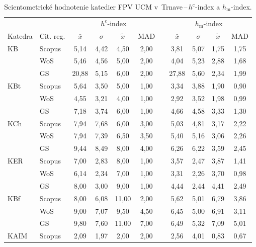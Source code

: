 \begin{table}
  \centering\small
  \caption[Hodnotenie FPV\,--\,$h^{\mathrm{c}}$-index a $h_{\mathrm{m}}$-index]%
  {Scientometrické hodnotenie katedier FPV UCM v~Trnave\,--\,$h^{\mathrm{c}}$-index a $h_{\mathrm{m}}$-index.}
  \label{tab:6-staff.results}
  \begin{tabularx}{\textwidth}{Xlcccclcccc}
    \toprule
    & & \multicolumn{4}{c}{$h^{\mathrm{c}}$-index} & & \multicolumn{4}{c}{$h_{\mathrm{m}}$-index} \\
    \cmidrule{3-6}\cmidrule{8-11}
    Katedra & Cit. reg. & $\bar{x}$ & $\sigma$ & $\tilde{x}$ & MAD & & $\bar{x}$ & $\sigma$ & $\tilde{x}$ & MAD \\
    \midrule
    KB   & Scopus & 5,14  & 4,42 & 4,50  & 2,00 & & 3,81  & 5,07 & 1,75 & 1,75 \\
         & WoS    & 5,46  & 4,56 & 5,00  & 2,00 & & 4,04  & 5,23 & 2,88 & 1,68 \\
         & GS     & 20,88 & 5,15 & 6,00  & 2,00 & & 27,88 & 5,60 & 2,34 & 1,99 \\[1ex]
    KBt  & Scopus & 5,64  & 3,50 & 5,00  & 1,00 & & 3,34  & 3,88 & 1,90 & 0,90 \\
         & WoS    & 4,55  & 3,21 & 4,00  & 1,00 & & 2,92  & 3,52 & 1,98 & 0,99 \\
         & GS     & 7,18  & 3,74 & 6,00  & 1,00 & & 4,66  & 4,58 & 3,33 & 1,30 \\[1ex]
    KCh  & Scopus & 7,94  & 7,68 & 6,00  & 3,00 & & 5,03  & 4,81 & 3,17 & 2,22 \\
         & WoS    & 7,94  & 7,39 & 6,50  & 3,50 & & 5,40  & 5,16 & 3,06 & 2,26 \\
         & GS     & 9,44  & 8,49 & 8,00  & 4,00 & & 6,26  & 6,22 & 3,59 & 2,45 \\[1ex]
    KER  & Scopus & 7,00  & 2,83 & 8,00  & 1,00 & & 3,57  & 2,47 & 3,87 & 1,41 \\
         & WoS    & 6,14  & 2,34 & 7,00  & 1,00 & & 3,31  & 2,26 & 3,70 & 0,98 \\
         & GS     & 8,00  & 3,00 & 9,00  & 1,00 & & 4,44  & 2,44 & 4,41 & 2,49 \\[1ex]
    KBf  & Scopus & 8,00  & 6,08 & 11,00 & 2,00 & & 5,62  & 5,01 & 6,79 & 3,86 \\
         & WoS    & 9,00  & 7,07 & 9,50  & 4,50 & & 6,45  & 5,00 & 6,91 & 3,11 \\
         & GS     & 9,80  & 7,60 & 11,00 & 7,00 & & 6,49  & 5,32 & 7,09 & 5,01 \\[1ex]
    KAIM & Scopus & 2,09  & 1,97 & 2,00  & 2,00 & & 2,56  & 4,01 & 0,83 & 0,67 \\

\end{tabularx}
\end{table}
